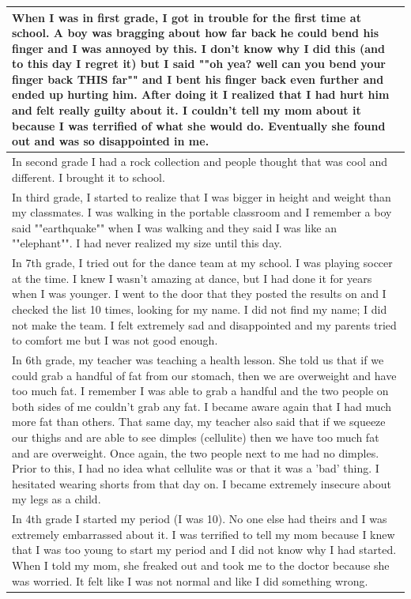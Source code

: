 \documentclass[
  .7em,
  letterpaper,
  DIV=11,
  numbers=noendperiod]{scrartcl}
\begin{document}
\begin{table}
\begin{tabular}{l}
\hline
When I was in first grade, I got in trouble for the first time at school. A boy was bragging about how far back he could bend his finger and I was annoyed by this. I don't know why I did this (and to this day I regret it) but I said ""oh yea? well can you bend your finger back THIS far"" and I bent his finger back even further and ended up hurting him. After doing it I realized that I had hurt him and felt really guilty about it. I couldn't tell my mom about it because I was terrified of what she would do. Eventually she found out and was so disappointed in me.\\
\hline
In second grade I had a rock collection and people thought that was cool and different. I brought it to school.\\
\hline
In third grade, I started to realize that I was bigger in height and weight than my classmates. I was walking in the portable classroom and I remember a boy said ""earthquake"" when I was walking and they said I was like an ""elephant"". I had never realized my size until this day.\\
\hline
In 7th grade, I tried out for the dance team at my school. I was playing soccer at the time. I knew I wasn't amazing at dance, but I had done it for years when I was younger. I went to the door that they posted the results on and I checked the list 10 times, looking for my name. I did not find my name; I did not make the team. I felt extremely sad and disappointed and my parents tried to comfort me but I was not good enough.\\
\hline
In 6th grade, my teacher was teaching a health lesson. She told us that if we could grab a handful of fat from our stomach, then we are overweight and have too much fat. I remember I was able to grab a handful and the two people on both sides of me couldn't grab any fat. I became aware again that I had much more fat than others. That same day, my teacher also said that if we squeeze our thighs and are able to see dimples (cellulite) then we have too much fat and are overweight. Once again, the two people next to me had no dimples. Prior to this, I had no idea what cellulite was or that it was a 'bad' thing. I hesitated wearing shorts from that day on. I became extremely insecure about my legs as a child.\\
\hline
In 4th grade I started my period (I was 10). No one else had theirs and I was extremely embarrassed about it. I was terrified to tell my mom because I knew that I was too young to start my period and I did not know why I had started. When I told my mom, she freaked out and took me to the doctor because she was worried. It felt like I was not normal and like I did something wrong.\\

\end{tabular}
\end{table}
\end{document}
